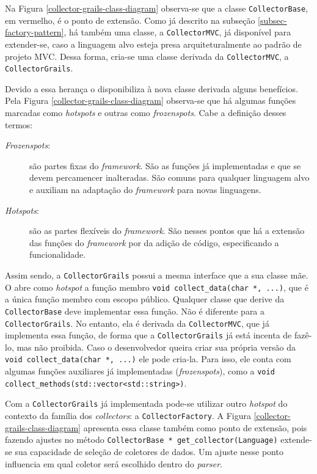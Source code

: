 Na Figura \ref{collector-grails-class-diagram} observa-se que a classe
\lstinline|CollectorBase|, em vermelho, é o ponto de extensão. Como já descrito
na subseção \ref{subsec-factory-pattern}, há também uma classe, a \lstinline|CollectorMVC|,
já disponível para extender-se, caso a linguagem alvo esteja presa
arquiteturalmente ao padrão de projeto MVC. Dessa forma, cria-se uma classe
derivada da \lstinline|CollectorMVC|, a \lstinline|CollectorGrails|.

Devido a essa herança o \framework disponibiliza à nova classe derivada
alguns benefícios. Pela Figura \ref{collector-grails-class-diagram} observa-se
que há algumas funções marcadas como \textit{hotspots} e outras como 
\textit{frozenspots}. Cabe a definição desses termos:

\begin{description}
\item[\textit{Frozenspots}:] são partes fixas do \textit{framework}. São as funções já
implementadas e que se devem percamencer inalteradas. São comuns para qualquer linguagem alvo e auxiliam na adaptação do \textit{framework} para novas linguagens.
\item[	\textit{Hotspots}:] são as partes flexíveis do \textit{framework}. São nesses
pontos que há a extensão das funções do \textit{framework} por da adição de
código, especificando a funcionalidade.
\end{description}

Assim sendo, a \lstinline|CollectorGrails| possui a mesma interface que a
sua classe mãe. O \framework abre como \textit{hotspot} a função
membro \lstinline|void collect_data(char *, ...)|, que é a única função membro
com escopo público. Qualquer classe que derive da \lstinline|CollectorBase| deve
implementar essa função. Não é diferente para a \lstinline|CollectorGrails|. No
entanto, ela é derivada da \lstinline|CollectorMVC|, que já implementa essa
função, de forma que a \lstinline|CollectorGrails| já está incenta de fazê-lo, mas
não proibida. Caso o desenvolvedor queira criar sua própria versão da
\lstinline|void collect_data(char *, ...)| ele pode cria-la. Para isso, ele conta
com algumas funções auxiliares já implementadas (\textit{frozenspots}), como a
\lstinline|void collect_methods(std::vector<std::string>)|.

Com a \lstinline|CollectorGrails| já implementada pode-se utilizar outro
\textit{hotspot} do contexto da família dos \textit{collectors}: a
\lstinline|CollectorFactory|. A Figura \ref{collector-grails-class-diagram}
apresenta essa classe também como ponto de extensão, pois fazendo ajustes no
método \lstinline|CollectorBase * get_collector(Language)| extende-se sua
capacidade de seleção de coletores de dados. Um ajuste nesse ponto influencia
em qual coletor será escolhido dentro do \textit{parser}.

